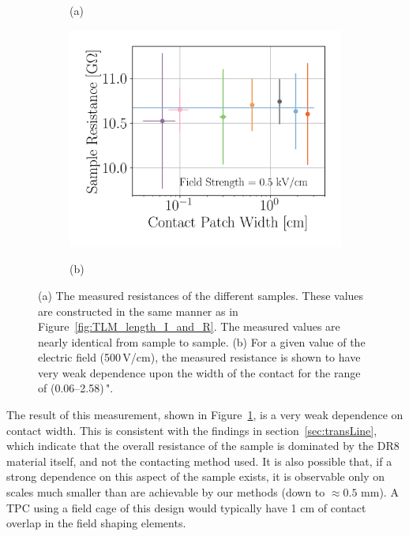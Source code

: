 \documentclass[a4paper,12pt]{article}
\newcommand{\DR}{DR8}
\begin{document}
\begin{figure}[htb]
\begin{subfigure}[c]{0.32\textheight}
\begin{center}
    \vspace*{-\baselineskip} \hspace{1em} (a)
\end{center}
\end{subfigure}
\begin{subfigure}[c]{0.32\textheight}
\begin{center}
    \includegraphics[width=\textwidth]{TLM_contact_fit.png}
    
    \vspace*{-\baselineskip} \hspace{2em} (b)
\end{center}
\end{subfigure}
\caption{(a) The measured resistances of the different samples.  These values are constructed in the same manner as in Figure~\ref{fig:TLM_length_I_and_R}.  The measured values are nearly identical from sample to sample. (b) For a given value of the electric field (500\,V/cm), the measured resistance is shown to have very weak dependence upon the width of the contact for the range of (0.06--2.58)\,".} 
\label{fig:TLM_contact_contactRes}
\end{figure}

The result of this measurement, shown in Figure~\ref{fig:TLM_contact_contactRes}, is a very weak dependence on contact width.  This is consistent with the findings in section~\ref{sec:transLine}, which indicate that the overall resistance of the sample is dominated by the {\DR} material itself, and not the contacting method used.  It is also possible that, if a strong dependence on this aspect of the sample exists, it is observable only on scales much smaller than are achievable by our methods (down to $\approx 0.5$ mm).  A TPC using a field cage of this design would typically have 1 cm of contact overlap in the field shaping elements.
\end{document}
